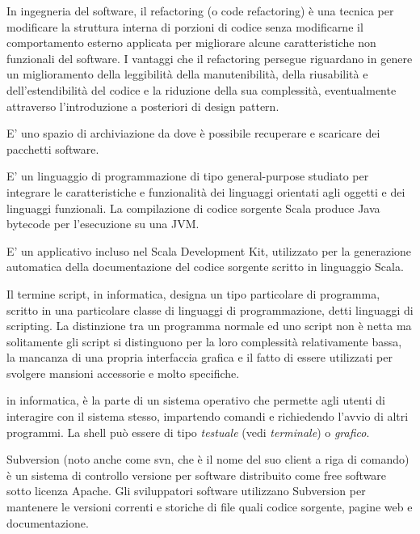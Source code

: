 \documentclass{scalatekids-article}
\begin{document}
   In ingegneria del software, il refactoring (o code refactoring) è una tecnica per modificare la struttura interna di porzioni di codice senza modificarne il comportamento esterno applicata per migliorare alcune caratteristiche non funzionali del software.
  I vantaggi che il refactoring persegue riguardano in genere un miglioramento della leggibilità della manutenibilità, della riusabilità e dell'estendibilità del codice e la riduzione della sua complessità, eventualmente attraverso l'introduzione a posteriori di design pattern.

   E' uno spazio di archiviazione da dove è possibile recuperare e scaricare dei pacchetti software.


   E' un linguaggio di programmazione di tipo general-purpose studiato per integrare le caratteristiche e funzionalità dei linguaggi orientati agli oggetti e dei linguaggi funzionali. La compilazione di codice sorgente Scala produce Java bytecode per l'esecuzione su una JVM.

   E' un applicativo incluso nel Scala Development Kit, utilizzato per la generazione automatica della documentazione del codice sorgente scritto in linguaggio Scala.

   Il termine script, in informatica, designa un tipo particolare di programma, scritto in una particolare classe di linguaggi di programmazione, detti linguaggi di scripting.
  La distinzione tra un programma normale ed uno script non è netta ma solitamente gli script si distinguono per la loro complessità relativamente bassa, la mancanza di una propria interfaccia grafica e il fatto di essere utilizzati per svolgere mansioni accessorie e molto specifiche.

   in informatica, è la parte di un sistema operativo che permette agli utenti di interagire con il sistema stesso, impartendo comandi e richiedendo l'avvio di altri programmi.
  La shell può essere di tipo \textit{testuale} (vedi \textit{terminale}) o \textit{grafico}.

   Subversion (noto anche come svn, che è il nome del suo client a riga di comando) è un sistema di controllo versione per software distribuito come free software sotto licenza Apache.
  Gli sviluppatori software utilizzano Subversion per mantenere le versioni correnti e storiche di file quali codice sorgente, pagine web e documentazione.
\end{document}
